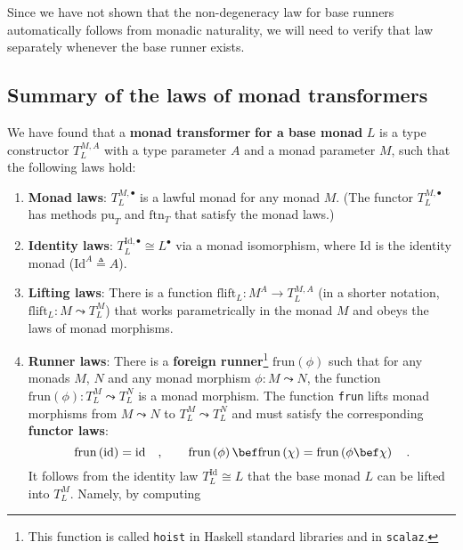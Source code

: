 Since we have not shown that the non-degeneracy law for base runners
automatically follows from monadic naturality, we will need to verify
that law separately whenever the base runner exists.

\subsection{Summary of the laws of monad transformers\label{subsec:Laws-of-monad-transformers}}

We have found that a \textbf{monad transformer}
\textbf{for a base monad} $L$ is a type constructor $T_{L}^{M,A}$
with a type parameter $A$ and a monad parameter $M$, such that the
following laws hold:
\begin{enumerate}
\item \textbf{Monad laws}: $T_{L}^{M,\bullet}$ is a lawful monad for any
monad $M$. (The functor $T_{L}^{M,\bullet}$
has methods $\text{pu}_{T}$ and $\text{ftn}_{T}$ that satisfy the
monad laws.)
\item \textbf{Identity laws}: $T_{L}^{\text{Id},\bullet}\cong L^{\bullet}$
via a monad isomorphism, where $\text{Id}$ is the identity monad
($\text{Id}^{A}\triangleq A$).
\item \textbf{Lifting laws}: There
is a function $\text{flift}_{L}:M^{A}\rightarrow T_{L}^{M,A}$ (in
a shorter notation, $\text{flift}_{L}:M\leadsto T_{L}^{M}$) that
works parametrically in the monad $M$ and obeys the laws of monad
morphisms.
\item \textbf{Runner laws}: There
is a \textbf{foreign runner}\footnote{This function is called \lstinline!hoist! in Haskell standard libraries
and in \texttt{scalaz}.} $\text{frun}\left(\phi\right)$ such that for any monads $M$, $N$
and any monad morphism $\phi:M\leadsto N$, the function $\text{frun}\left(\phi\right):T_{L}^{M}\leadsto T_{L}^{N}$
is a monad morphism. The function \lstinline!frun! lifts monad morphisms
from $M\leadsto N$ to $T_{L}^{M}\leadsto T_{L}^{N}$ and must satisfy
the corresponding \textbf{functor laws}:
\[
\text{frun}\left(\text{id}\right)=\text{id}\quad,\quad\quad\text{frun}\left(\phi\right)\bef\text{frun}\left(\chi\right)=\text{frun}\left(\phi\bef\chi\right)\quad.
\]
It follows from the identity law $T_{L}^{\text{Id}}\cong L$ that
the base monad $L$ can be lifted into $T_{L}^{M}$. Namely, by computing

\end{enumerate}
